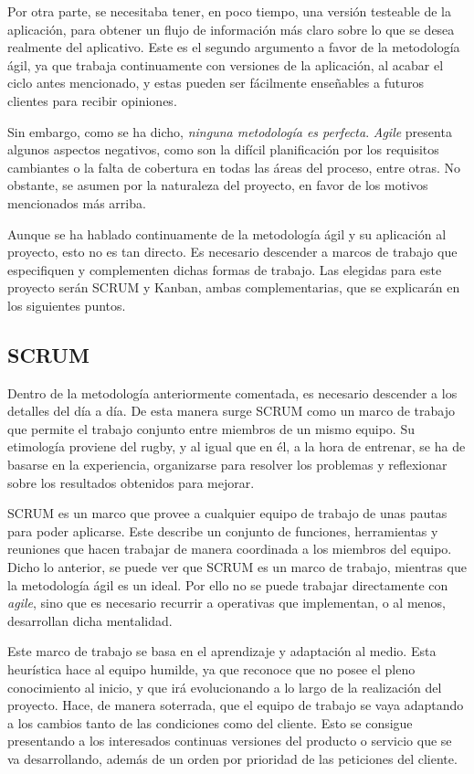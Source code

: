 Por otra parte, se necesitaba tener, en poco tiempo, una versión testeable de la aplicación, para obtener un flujo de información más claro sobre lo que se desea realmente del aplicativo. Este es el segundo argumento a favor de la metodología ágil, ya que trabaja continuamente con versiones de la aplicación, al acabar el ciclo antes mencionado, y estas pueden ser fácilmente enseñables a futuros clientes para recibir opiniones.

Sin embargo, como se ha dicho, \textit{ninguna metodología es perfecta}. \textit{Agile} presenta algunos aspectos negativos, como son la difícil planificación por los requisitos cambiantes o la falta de cobertura en todas las áreas del proceso, entre otras. No obstante, se asumen por la naturaleza del proyecto, en favor de los motivos mencionados más arriba.

Aunque se ha hablado continuamente de la metodología ágil y su aplicación al proyecto, esto no es tan directo. Es necesario descender a marcos de trabajo que especifiquen y complementen dichas formas de trabajo. Las elegidas para este proyecto serán SCRUM y Kanban, ambas complementarias, que se explicarán en los siguientes puntos.

\subsection{SCRUM}
Dentro de la metodología anteriormente comentada, es necesario descender a los detalles del día a día. De esta manera surge SCRUM como un marco de trabajo que permite el trabajo conjunto entre miembros de un mismo equipo. Su etimología proviene del rugby, y al igual que en él, a la hora de entrenar, se ha de basarse en la experiencia, organizarse para resolver los problemas y reflexionar sobre los resultados obtenidos para mejorar.

SCRUM es un marco que provee a cualquier equipo de trabajo de unas pautas para poder aplicarse. Este describe un conjunto de funciones, herramientas y reuniones que hacen trabajar de manera coordinada a los miembros del equipo. Dicho lo anterior, se puede ver que SCRUM es un marco de trabajo, mientras que la metodología ágil es un ideal. Por ello no se puede trabajar directamente con \textit{agile}, sino que es necesario recurrir a operativas que implementan, o al menos, desarrollan dicha mentalidad.

Este marco de trabajo se basa en el aprendizaje y adaptación al medio. Esta heurística hace al equipo humilde, ya que reconoce que no posee el pleno conocimiento al inicio, y que irá evolucionando a lo largo de la realización del proyecto. Hace, de manera soterrada, que el equipo de trabajo se vaya adaptando a los cambios tanto de las condiciones como del cliente. Esto se consigue presentando a los interesados continuas versiones del producto o servicio que se va desarrollando, además de un orden por prioridad de las peticiones del cliente.

